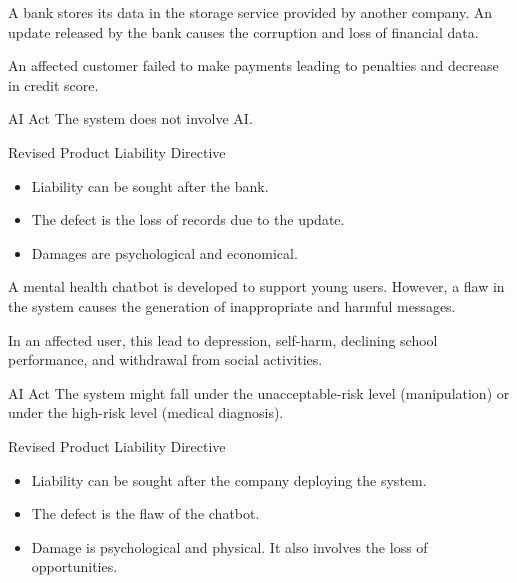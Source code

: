 \begin{example}
    A bank stores its data in the storage service provided by another company. An update released by the bank causes the corruption and loss of financial data.

    An affected customer failed to make payments leading to penalties and decrease in credit score.    

    \begin{descriptionlist}
        \item[AI Act] The system does not involve AI.
        \item[Revised Product Liability Directive] \phantom{}
            \begin{itemize}
                \item Liability can be sought after the bank. 
                \item The defect is the loss of records due to the update. 
                \item Damages are psychological and economical.
            \end{itemize}
    \end{descriptionlist}
\end{example}

\begin{example}
    A mental health chatbot is developed to support young users. However, a flaw in the system causes the generation of inappropriate and harmful messages.

    In an affected user, this lead to depression, self-harm, declining school performance, and withdrawal from social activities.

    \begin{descriptionlist}
        \item[AI Act] The system might fall under the unacceptable-risk level (manipulation) or under the high-risk level (medical diagnosis).
        \item[Revised Product Liability Directive] \phantom{}
            \begin{itemize}
                \item Liability can be sought after the company deploying the system.
                \item The defect is the flaw of the chatbot.
                \item Damage is psychological and physical. It also involves the loss of opportunities.
            \end{itemize}
    \end{descriptionlist}
\end{example}

